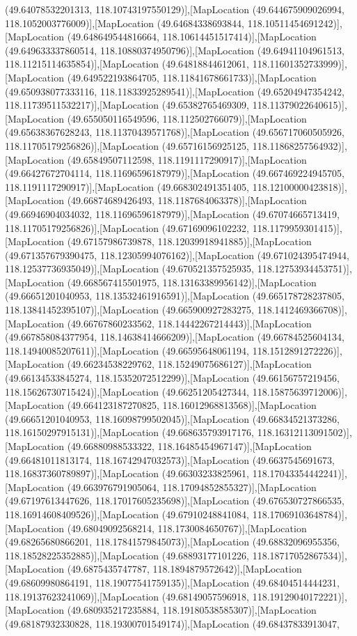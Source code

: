 (49.64078532201313, 118.10743197550129)],[MapLocation (49.644675909026994, 118.1052003776009)],[MapLocation (49.64684338693844, 118.10511454691242)],[MapLocation (49.648649544816664, 118.10614451517414)],[MapLocation (49.649633337860514, 118.10880374950796)],[MapLocation (49.64941104961513, 118.11215114635854)],[MapLocation (49.64818844612061, 118.11601352733999)],[MapLocation (49.649522193864705, 118.11841678661733)],[MapLocation (49.650938077333116, 118.11833925289541)],[MapLocation (49.65204947354242, 118.11739511532217)],[MapLocation (49.65382765469309, 118.11379022640615)],[MapLocation (49.655050116549596, 118.112502766079)],[MapLocation (49.65638367628243, 118.11370439571768)],[MapLocation (49.656717060505926, 118.11705179256826)],[MapLocation (49.65716156925125, 118.11868257564932)],[MapLocation (49.65849507112598, 118.1191117290917)],[MapLocation (49.66427672704114, 118.11696596187979)],[MapLocation (49.667469224945705, 118.1191117290917)],[MapLocation (49.668302491351405, 118.12100000423818)],[MapLocation (49.66874689426493, 118.1187684063378)],[MapLocation (49.66946904034032, 118.11696596187979)],[MapLocation (49.67074665713419, 118.11705179256826)],[MapLocation (49.67169096102232, 118.1179959301415)],[MapLocation (49.67157986739878, 118.12039918941885)],[MapLocation (49.671357679390475, 118.12305994076162)],[MapLocation (49.671024395474944, 118.12537736935049)],[MapLocation (49.670521357525935, 118.12753934453751)],[MapLocation (49.668567415501975, 118.13163389956142)],[MapLocation (49.66651201040953, 118.13532461916591)],[MapLocation (49.665178728237805, 118.13841452395107)],[MapLocation (49.665900927283275, 118.1412469366708)],[MapLocation (49.66767860233562, 118.14442267214443)],[MapLocation (49.667858084377954, 118.14638414666209)],[MapLocation (49.66784525604134, 118.14940085207611)],[MapLocation (49.66595648061194, 118.1512891272226)],[MapLocation (49.66234538229762, 118.15249075686127)],[MapLocation (49.66134533845274, 118.15352072512299)],[MapLocation (49.66156757219456, 118.15626730715424)],[MapLocation (49.66251205427344, 118.15875639712006)],[MapLocation (49.664123187270825, 118.16012968813568)],[MapLocation (49.66651201040953, 118.16098799502045)],[MapLocation (49.66834521373286, 118.16150297915131)],[MapLocation (49.668635793917176, 118.16312113091502)],[MapLocation (49.66880988533322, 118.16485454967147)],[MapLocation (49.66481011813174, 118.16742947032573)],[MapLocation (49.6637545691673, 118.16837360789897)],[MapLocation (49.66303233825961, 118.17043354442241)],[MapLocation (49.663976791905064, 118.17094852855327)],[MapLocation (49.67197613447626, 118.17017605235698)],[MapLocation (49.676530727866535, 118.16914608409526)],[MapLocation (49.67910248841084, 118.17069103648784)],[MapLocation (49.68049092568214, 118.1730084650767)],[MapLocation (49.68265680866201, 118.17841579845073)],[MapLocation (49.68832096955356, 118.18528225352885)],[MapLocation (49.68893177101226, 118.18717052867534)],[MapLocation (49.6875435747787, 118.1894879572642)],[MapLocation (49.68609980864191, 118.19077541759135)],[MapLocation (49.68404514444231, 118.19137623241069)],[MapLocation (49.68149057596918, 118.19129040172221)],[MapLocation (49.680935217235884, 118.19180538585307)],[MapLocation (49.68187932330828, 118.19300701549174)],[MapLocation (49.68437833913047, 